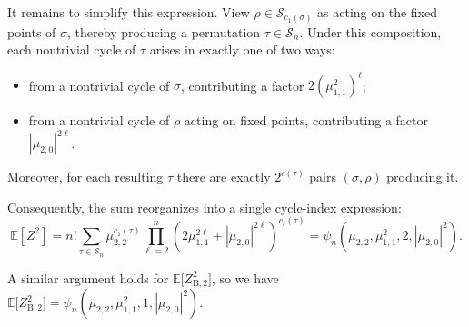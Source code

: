 \documentclass[conference]{IEEEtran}
\theoremstyle{plain}
\theoremstyle{definition}
\newcommand{\B}{\mathrm{B}}
\newcommand{\E}{\mathbb {E}}
\begin{document}
 It remains to simplify this expression. View $\rho\in
 \mathcal{S}_{c_1(\sigma)}$ as acting on the fixed points of $\sigma$, thereby
 producing a permutation $\tau\in \mathcal{S}_n$. Under this composition, each
 nontrivial cycle of $\tau$ arises in exactly one of two ways:
 \begin{itemize}
  \item from a nontrivial cycle of $\sigma$, contributing a factor
  \(2(\mu_{1,1}^2)^\ell\);
  \item from a nontrivial cycle of $\rho$ acting on fixed points, contributing
  a factor \(|\mu_{2,0}|^{2\ell}\).
 \end{itemize}
 Moreover, for each resulting $\tau$ there are exactly $2^{c(\tau)}$ pairs
 $(\sigma,\rho)$ producing it.

 Consequently, the sum reorganizes into a single cycle-index expression:
 \[\E[Z^2]=n!\sum_{\tau\in \mathcal{S}_n} \mu_{2,2}^{c_1({\tau})}\prod_{\ell= 2}^n(2\mu_{1,1}^{2\ell}+|\mu_{2,0}|^{2\ell})^{c_\ell(\tau)}=\psi_n(\mu_{2,2}, \mu_{1,1}^2, 2, |\mu_{2,0}|^2).\]

 A similar argument holds for $\E \big[Z_{\B,2}^2\big]$, so we have $\E
 \big[Z_{\B,2}^2\big]=\psi_n (\mu_{2,2}, \mu_{1,1}^2, 1, |\mu_{2,0}|^2)$.

\end{document}
